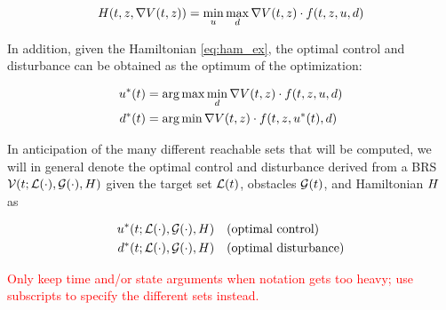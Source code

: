 \begin{equation}
\label{eq:ham_ex}
\begin{aligned}
\ham(t, \state, \nabla \valfunc(t,\state)) = \min_\ctrl \max_\dstb \nabla \valfunc(t,\state) \cdot \fdyn(t, \state, \ctrl, \dstb)
\end{aligned}
\end{equation}

In addition, given the Hamiltonian \eqref{eq:ham_ex}, the optimal control and disturbance can be obtained as the optimum of the optimization:

\begin{equation}
\label{eq:opt_ctrl_dstb_ex}
\begin{aligned}
\ctrl^*(t) &= \arg \max \min_\dstb \nabla \valfunc(t,\state) \cdot \fdyn(t, \state, \ctrl, \dstb)\\
\dstb^*(t) &= \arg \min \nabla \valfunc(t,\state) \cdot \fdyn(t, \state, \ctrl^*(t), \dstb)
\end{aligned}
\end{equation}

In anticipation of the many different reachable sets that will be computed, we will in general denote the optimal control and disturbance derived from a BRS $\mathcal{V}(t; \mathcal{L}(\cdot), \mathcal{G}(\cdot), H)$ given the target set $\mathcal{L}(t)$, obstacles $\mathcal{G}(t)$, and Hamiltonian $H$ as 

\begin{equation}
\label{eq:opt_ctrl}
\begin{aligned}
\ctrl^*(t; \targetset(\cdot), \obsset(\cdot), \ham) &\quad \text{(optimal control)} \\
\dstb^*(t; \targetset(\cdot), \obsset(\cdot), \ham) &\quad \text{(optimal disturbance)}
\end{aligned}
\end{equation}

\textcolor{red}{Only keep time and/or state arguments when notation gets too heavy; use subscripts to specify the different sets instead.}
